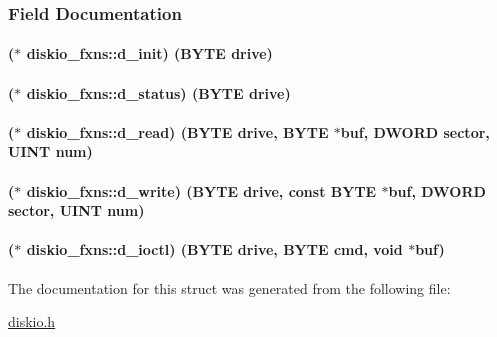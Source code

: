 \subsubsection{Field Documentation}
\paragraph[{d\+\_\+init}]{($\ast$ diskio\+\_\+fxns\+::d\+\_\+init) ({\bf B\+Y\+T\+E} drive)}\label{structdiskio__fxns_ad6ff6dff8b8919b44120758491e06d51}
\paragraph[{d\+\_\+status}]{($\ast$ diskio\+\_\+fxns\+::d\+\_\+status) ({\bf B\+Y\+T\+E} drive)}\label{structdiskio__fxns_a18b3f84113bc435d18db04fe745b5dfe}
\paragraph[{d\+\_\+read}]{($\ast$ diskio\+\_\+fxns\+::d\+\_\+read) ({\bf B\+Y\+T\+E} drive, {\bf B\+Y\+T\+E} $\ast$buf, {\bf D\+W\+O\+R\+D} sector, {\bf U\+I\+N\+T} num)}\label{structdiskio__fxns_ad8185cf99f04b5af57615f345194f942}
\paragraph[{d\+\_\+write}]{($\ast$ diskio\+\_\+fxns\+::d\+\_\+write) ({\bf B\+Y\+T\+E} drive, const {\bf B\+Y\+T\+E} $\ast$buf, {\bf D\+W\+O\+R\+D} sector, {\bf U\+I\+N\+T} num)}\label{structdiskio__fxns_a434906fb1e70c375c203877cd696ffdf}
\paragraph[{d\+\_\+ioctl}]{($\ast$ diskio\+\_\+fxns\+::d\+\_\+ioctl) ({\bf B\+Y\+T\+E} drive, {\bf B\+Y\+T\+E} cmd, void $\ast$buf)}\label{structdiskio__fxns_a9a1890d985a25c6e14efc8d74a85a498}


The documentation for this struct was generated from the following file\+:\begin{DoxyCompactItemize}
\item 
\hyperlink{diskio_8h}{diskio.\+h}\end{DoxyCompactItemize}
